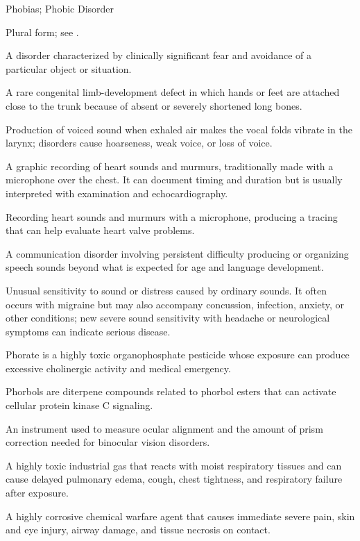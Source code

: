 \synonyms
Phobias; Phobic Disorder

 Plural form; see .

 A disorder characterized by clinically significant fear and avoidance of a particular object or situation.

 A rare congenital limb-development defect in which hands or feet are attached close to the trunk because of absent or severely shortened long bones.

 Production of voiced sound when exhaled air makes the vocal folds vibrate in the larynx; disorders cause hoarseness, weak voice, or loss of voice.

 A graphic recording of heart sounds and murmurs, traditionally made with a microphone over the chest. It can document timing and duration but is usually interpreted with examination and echocardiography.

 Recording heart sounds and murmurs with a microphone, producing a tracing that can help evaluate heart valve problems.

 A communication disorder involving persistent difficulty producing or organizing speech sounds beyond what is expected for age and language development.

 Unusual sensitivity to sound or distress caused by ordinary sounds. It often occurs with migraine but may also accompany concussion, infection, anxiety, or other conditions; new severe sound sensitivity with headache or neurological symptoms can indicate serious disease.

 Phorate is a highly toxic organophosphate pesticide whose exposure can produce excessive cholinergic activity and medical emergency.

 Phorbols are diterpene compounds related to phorbol esters that can activate cellular protein kinase C signaling.

 An instrument used to measure ocular alignment and the amount of prism correction needed for binocular vision disorders.

 A highly toxic industrial gas that reacts with moist respiratory tissues and can cause delayed pulmonary edema, cough, chest tightness, and respiratory failure after exposure.

 A highly corrosive chemical warfare agent that causes immediate severe pain, skin and eye injury, airway damage, and tissue necrosis on contact.

